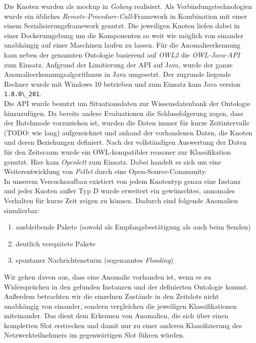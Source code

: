 Die Knoten wurden als \Gls{mockup} in \textit{Golang}\cite{golang} realisiert. Als Verbindungstechnologien wurde ein übliches \textit{Remote-Procedure-Call}-Framework\cite{grpc} in Kombination mit einer einem Serialisierungsframework\cite{protobuf} genutzt. Die jeweiligen Knoten liefen dabei in einer Dockerumgebung\cite{docker} um die Komponenten so weit wie möglich von einander unabhängig auf einer Maschinen laufen zu lassen. Für die Anomalieerkennung kam neben der genannten Ontologie basierend auf \textit{OWL2}\cite{owl2} die \textit{OWL-Java-API}\cite{owlapi} zum Einsatz. Aufgrund der Limitierung der API auf Java, wurde der ganze Anomalieerkennungsalgorithmus in Java umgesetzt. Der zugrunde liegende Rechner wurde mit Windows 10 betrieben und zum Einsatz kam Java version \verb|1.8.0\_281|.\\
Die API wurde benutzt um Situationsdaten zur Wissensdatenbank der Ontologie hinzuzufügen. Da bereits andere Evaluationen die Schlussfolgerung zogen, dass der Batchmode vorzuziehen ist, wurden die Daten immer für kurze Zeitintervalle (TODO: wie lang) aufgezeichnet und anhand der vorhandenen Daten, die Knoten und deren Beziehungen definiert. Nach der vollständigen Auswertung der Daten für den Zeitsraum wurde ein OWL-kompatibler \Gls{reasoner} zur Klassifikation genutzt. Hier kam \textit{Openlett}\cite{openlett} zum Einsatz. Dabei handelt es sich um eine Weiterentwicklung von \textit{Pellet}\cite{pellet} durch eine Open-Source-Community.\\
In unserem Versuchsaufbau existiert von jedem Knotentyp genau eine Instanz und jeder Knoten außer Typ D wurde erweitert ein gewünschtes, annomales Verhalten für kurze Zeit zeigen zu können. Dadurch sind folgende Anomalien simulierbar:
\begin{enumerate}
\item ausbleibende Pakete (sowohl als Empfangsbestätigung als auch beim Senden)
\item deutlich verspätete Pakete
\item spontaner Nachrichtensturm (sogenanntes \textit{Flooding})
\end{enumerate}
Wir gehen davon aus, dass eine Anomalie vorhanden ist, wenn es zu Widersprüchen in den gefunden Instanzen und der definierten Ontologie kommt. Außerdem betrachten wir die einzelnen Zustände in den Zeitslots nicht unabhängig von einander, sondern vergleichen die jeweiligen Klassifikationen miteinander. Das dient dem Erkennen von Anomalien, die sich über einen kompletten Slot erstrecken und damit nur zu einer anderen Klassifizierung des Netzwerkteilnehmers im gegenwärtigen Slot führen würden.

